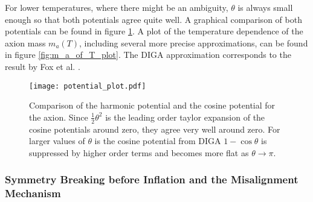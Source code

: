 \documentclass[twoside,a4paper, 12pt]{article}
\numberwithin{equation}{section}
\begin{document}
For lower temperatures, where there might be an ambiguity, $\theta$ is always small
enough so that both potentials agree quite well.
A graphical comparison of both potentials can be found in figure \ref{fig:potential_plot}.
A plot of the temperature dependence of the axion mass $m_a(T)$, including several more precise approximations, 
can be found in figure \ref{fig:m_a_of_T_plot}. The DIGA approximation corresponds to the result by Fox et al.
\cite{Fox:2004kb}.
\begin{figure}[H]
    \centering
    \texttt{[image: potential\_plot.pdf]}
    \caption{Comparison of the harmonic potential and the cosine potential for the axion. 
    Since $\frac{1}{2}\theta^2$ is the
    leading order taylor expansion of the cosine potentials around zero, they agree very well around zero.
    For larger values of $\theta$ is the cosine potential from DIGA $1 - \cos \theta$ is suppressed by higher order terms and becomes more flat as $\theta \rightarrow \pi$.}
    \label{fig:potential_plot}
\end{figure}

\newpage
\subsubsection{Symmetry Breaking before Inflation and the Misalignment Mechanism}
\label{sec:misalighment}
\label{sec:initial_conditions}
\label{sec:wkb_alp}
\label{sec:thermo}
\end{document}
